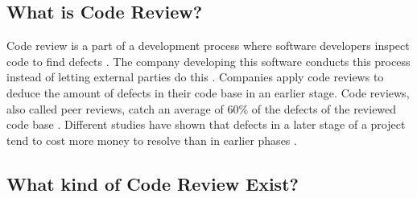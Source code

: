 \subsection*{What is Code Review?}

Code review is a part of a development process where software developers inspect code to find defects \autocite[47]{10.1109/MS.2003.1241366}.
The company developing this software conducts this process instead of letting external parties do this \autocite[47]{10.1109/MS.2003.1241366}.
Companies apply code reviews to deduce the amount of defects in their code base in an earlier stage.
Code reviews, also called peer reviews, catch an average of 60\% of the defects of the reviewed code base \autocite[136]{10.1109/2.962984}.
Different studies have shown that defects in a later stage of a project tend to cost more money to resolve than in earlier phases \autocite[135]{10.1109/2.962984} \autocite[21]{beck2000extreme}.

\subsection*{What kind of Code Review Exist?}

